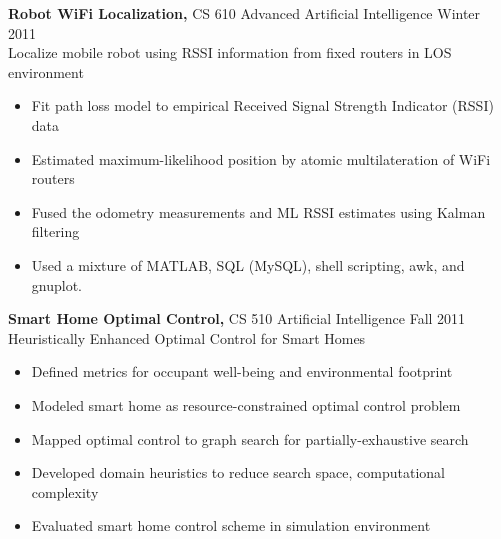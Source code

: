 \documentclass[margin]{res}
\begin{document}
\begin{resume}
\begin{tech}
{\bf Robot WiFi Localization,} CS 610 Advanced Artificial Intelligence \hfill Winter 2011 \\
Localize mobile robot using RSSI information from fixed routers in LOS environment
\begin{itemize} \itemsep -2pt %
\item Fit path loss model to empirical Received Signal Strength Indicator (RSSI) data
\item Estimated maximum-likelihood position by atomic multilateration of WiFi routers
\item Fused the odometry measurements and ML RSSI estimates using Kalman filtering
\item Used a mixture of MATLAB, SQL (MySQL), shell scripting, awk, and gnuplot.
\end{itemize}
\end{tech}

\begin{controls}
{\bf Smart Home Optimal Control,} CS 510 Artificial Intelligence \hfill Fall 2011 \\
Heuristically Enhanced Optimal Control for Smart Homes
\begin{itemize} \itemsep -2pt %
\item Defined metrics for occupant well-being and environmental footprint 
\item Modeled smart home as resource-constrained optimal control problem 
\item Mapped optimal control to graph search for partially-exhaustive search 
\item Developed domain heuristics to reduce search space, computational complexity 
\item Evaluated smart home control scheme in simulation environment
\end{itemize}
\end{controls}


\end{resume}
\end{document}
